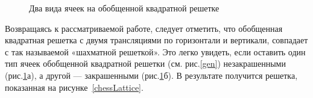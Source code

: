 \documentclass[utf8,12pt]{jetp}
\begin{document}
\begin{figure}[h]
	\begin{minipage}[h]{0.4\linewidth}
	\end{minipage}
	\hfill
	\begin{minipage}[h]{0.4\linewidth}
	\end{minipage}
	\caption{Два вида ячеек на обобщенной квадратной решетке}
	\label{cell}
\end{figure}

Возвращаясь к рассматриваемой работе, следует отметить, что обобщенная квадратная решетка с двумя трансляциями по горизонтали и вертикали, совпадает с так называемой «шахматной решеткой». Это легко увидеть, если оставить один тип ячеек обобщенной квадратной решетки (см. рис.\ref{gen}) незакрашенными (рис.\ref{cell}а), а другой — закрашенными (рис.\ref{cell}б). В результате получится решетка, показанная на рисунке~\ref{chessLattice}.
\end{document}
